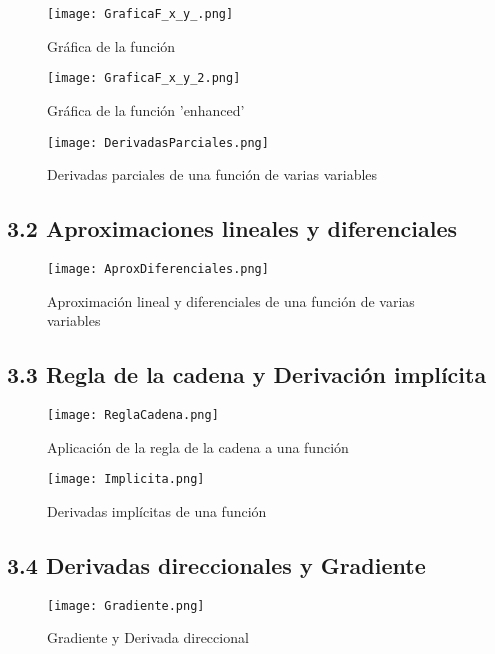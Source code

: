 \documentclass[a4 paper]{article}
\numberwithin{equation}{section}
\newcommand{\0}{\mathbf{0}}
\begin{document}
\newpage

\begin{figure}[!ht]
  \centering
      \texttt{[image: GraficaF\_x\_y\_.png]}
  \caption{Gr\'afica de la funci\'on}
\end{figure}

\begin{figure}[!ht]
  \centering
      \texttt{[image: GraficaF\_x\_y\_2.png]}
  \caption{Gr\'afica de la funci\'on 'enhanced'}
\end{figure}

\begin{figure}[!ht]
  \centering
      \texttt{[image: DerivadasParciales.png]}
  \caption{Derivadas parciales de una funci\'on de varias variables}
\end{figure}
\newpage
\subsection*{3.2 Aproximaciones lineales y diferenciales}

\begin{figure}[!ht]
  \centering
      \texttt{[image: AproxDiferenciales.png]}
  \caption{Aproximaci\'on lineal y diferenciales de una funci\'on de varias variables}
\end{figure}

\subsection*{3.3 Regla de la cadena y Derivaci\'on impl\'icita}

\begin{figure}[!ht]
  \centering
      \texttt{[image: ReglaCadena.png]}
  \caption{Aplicaci\'on de la regla de la cadena a una funci\'on}
\end{figure}

\begin{figure}[!ht]
  \centering
      \texttt{[image: Implicita.png]}
  \caption{Derivadas impl\'icitas de una funci\'on}
\end{figure}

\subsection*{3.4 Derivadas direccionales y Gradiente}
\newpage
\begin{figure}[!ht]
  \centering
      \texttt{[image: Gradiente.png]}
  \caption{Gradiente y Derivada direccional}
\end{figure}
\end{document}
